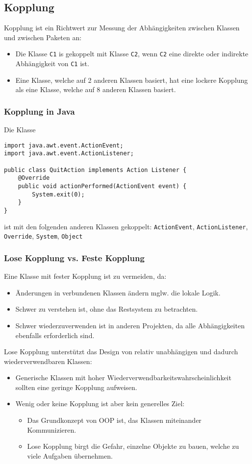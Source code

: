 \documentclass[a4paper, 11pt, accentcolor = tud3b]{tudreport}
\begin{document}
			\subsection{Kopplung}
				Kopplung ist ein Richtwert zur Messung der Abhängigkeiten zwischen Klassen und zwischen Paketen an:
				\begin{itemize}
					\item Die Klasse \texttt{C1} is gekoppelt mit Klasse \texttt{C2}, wenn \texttt{C2} eine direkte oder indirekte Abhängigkeit von \texttt{C1} ist.
					\item Eine Klasse, welche auf 2 anderen Klassen basiert, hat eine lockere Kopplung als eine Klasse, welche auf 8 anderen Klassen basiert.
				\end{itemize}
				
				\subsubsection{Kopplung in Java}
					Die Klasse
					\begin{lstlisting}
import java.awt.event.ActionEvent;
import java.awt.event.ActionListener;

public class QuitAction implements Action Listener {
	@Override
	public void actionPerformed(ActionEvent event) {
		System.exit(0);
	}
}
					\end{lstlisting}
					ist mit den folgenden anderen Klassen gekoppelt: \texttt{ActionEvent}, \texttt{ActionListener}, \texttt{Override}, \texttt{System}, \texttt{Object}
				
				\subsubsection{Lose Kopplung vs. Feste Kopplung}
					Eine Klasse mit fester Kopplung ist zu vermeiden, da:
					\begin{itemize}
						\item Änderungen in verbundenen Klassen ändern mglw. die lokale Logik.
						\item Schwer zu verstehen ist, ohne das Restsystem zu betrachten.
						\item Schwer wiederzuverwenden ist in anderen Projekten, da alle Abhängigkeiten ebenfalls erforderlich sind.
					\end{itemize}
					
					Lose Kopplung unterstützt das Design von relativ unabhängigen und dadurch wiederverwendbaren Klassen:
					\begin{itemize}
						\item Generische Klassen mit hoher Wiederverwendbarkeitswahrscheinlichkeit sollten eine geringe Kopplung aufweisen.
						\item Wenig oder keine Kopplung ist aber kein generelles Ziel:
							\begin{itemize}
								\item Das Grundkonzept von OOP ist, das Klassen miteinander Kommunizieren.
								\item Lose Kopplung birgt die Gefahr, einzelne Objekte zu bauen, welche zu viele Aufgaben übernehmen.
							\end{itemize}
					\end{itemize}
					
\end{document}

